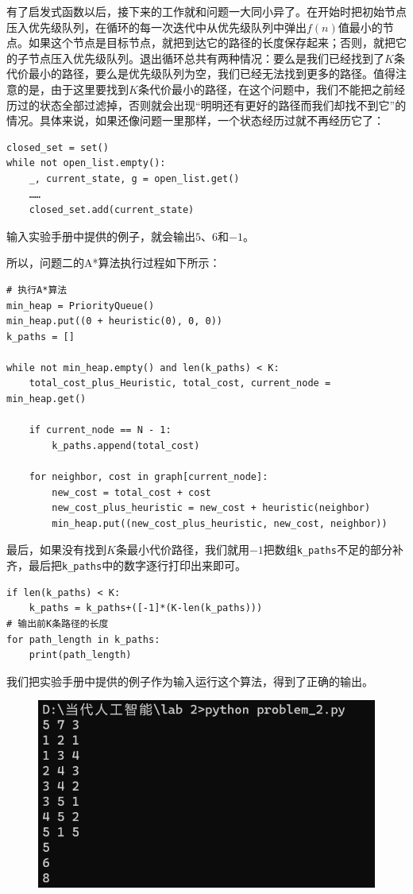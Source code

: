 \documentclass{article}
\begin{document}
有了启发式函数以后，接下来的工作就和问题一大同小异了。在开始时把初始节点压入优先级队列，在循环的每一次迭代中从优先级队列中弹出$f(n)$值最小的节点。如果这个节点是目标节点，就把到达它的路径的长度保存起来；否则，就把它的子节点压入优先级队列。退出循环总共有两种情况：要么是我们已经找到了$K$条代价最小的路径，要么是优先级队列为空，我们已经无法找到更多的路径。值得注意的是，由于这里要找到$K$条代价最小的路径，在这个问题中，我们不能把之前经历过的状态全部过滤掉，否则就会出现“明明还有更好的路径而我们却找不到它”的情况。具体来说，如果还像问题一里那样，一个状态经历过就不再经历它了：
\begin{lstlisting}
closed_set = set()
while not open_list.empty():
    _, current_state, g = open_list.get()
    ……
    closed_set.add(current_state)
\end{lstlisting}
输入实验手册中提供的例子，就会输出$5$、$6$和$-1$。

所以，问题二的A*算法执行过程如下所示：
\begin{lstlisting}
# 执行A*算法
min_heap = PriorityQueue()
min_heap.put((0 + heuristic(0), 0, 0))
k_paths = []

while not min_heap.empty() and len(k_paths) < K:
    total_cost_plus_Heuristic, total_cost, current_node = min_heap.get()

    if current_node == N - 1:
        k_paths.append(total_cost)

    for neighbor, cost in graph[current_node]:
        new_cost = total_cost + cost
        new_cost_plus_heuristic = new_cost + heuristic(neighbor)
        min_heap.put((new_cost_plus_heuristic, new_cost, neighbor))
\end{lstlisting}

最后，如果没有找到$K$条最小代价路径，我们就用$-1$把数组\lstinline|k_paths|不足的部分补齐，最后把\lstinline|k_paths|中的数字逐行打印出来即可。
\begin{lstlisting}
if len(k_paths) < K:
    k_paths = k_paths+([-1]*(K-len(k_paths)))
# 输出前K条路径的长度
for path_length in k_paths:
    print(path_length)
\end{lstlisting}

我们把实验手册中提供的例子作为输入运行这个算法，得到了正确的输出。
\begin{figure}[H]
    \centering
    \includegraphics[width=0.5\linewidth]{image8.png}
    \label{fig:enter-label}
\end{figure}
\end{document}
